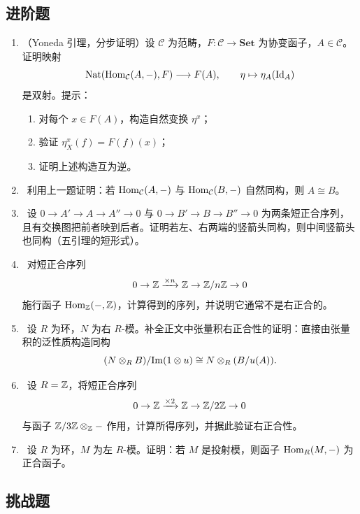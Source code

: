 \subsection*{进阶题}

\begin{enumerate}[resume, label=\textbf{习题A.\arabic*}, leftmargin=3.5em]
  \item \medium （Yoneda 引理，分步证明）设 $\mathcal C$ 为范畴，$F\colon \mathcal C\to \mathbf{Set}$ 为协变函子，$A\in \mathcal C$。证明映射
  \[
    \mathrm{Nat}(\mathrm{Hom}_{\mathcal C}(A,-),F)\longrightarrow F(A),
    \qquad \eta\mapsto \eta_A(\mathrm{Id}_A)
  \]
  是双射。提示：
  \begin{enumerate}[label=(\alph*), leftmargin=2.5em]
    \item 对每个 $x\in F(A)$，构造自然变换 $\eta^x$；
    \item 验证 $\eta^x_X(f)=F(f)(x)$；
    \item 证明上述构造互为逆。
  \end{enumerate}

  \item \medium\ 利用上一题证明：若 $\mathrm{Hom}_{\mathcal C}(A,-)$ 与 $\mathrm{Hom}_{\mathcal C}(B,-)$ 自然同构，则 $A\cong B$。

  \item \medium\ 设 $0\to A'\to A\to A''\to 0$ 与 $0\to B'\to B\to B''\to 0$ 为两条短正合序列，且有交换图把前者映到后者。证明若左、右两端的竖箭头同构，则中间竖箭头也同构（五引理的短形式）。

  \item \medium\ 对短正合序列
  \[
    0\to \mathbb{Z} \xrightarrow{\times n} \mathbb{Z} \to \mathbb{Z}/n\mathbb{Z} \to 0
  \]
  施行函子 $\mathrm{Hom}_{\mathbb{Z}}(-,\mathbb{Z})$，计算得到的序列，并说明它通常不是右正合的。

  \item \medium\ 设 $R$ 为环，$N$ 为右 $R$-模。补全正文中张量积右正合性的证明：直接由张量积的泛性质构造同构
  \[
    (N\otimes_R B)/\mathrm{Im}(1\otimes u)\cong N\otimes_R(B/u(A)).
  \]

  \item \medium\ 设 $R=\mathbb{Z}$，将短正合序列
  \[
    0\to \mathbb{Z} \xrightarrow{\times 2} \mathbb{Z} \to \mathbb{Z}/2\mathbb{Z} \to 0
  \]
  与函子 $\mathbb{Z}/3\mathbb{Z}\otimes_{\mathbb{Z}}-$ 作用，计算所得序列，并据此验证右正合性。

  \item \medium\ 设 $R$ 为环，$M$ 为左 $R$-模。证明：若 $M$ 是投射模，则函子 $\mathrm{Hom}_R(M,-)$ 为正合函子。
\end{enumerate}

\subsection*{挑战题}

